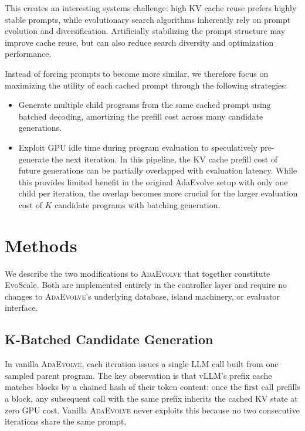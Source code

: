 \documentclass{article}
\newcommand{\adaev}{\textsc{AdaEvolve}}
\begin{document}
This creates an interesting systems challenge: high KV cache reuse prefers highly stable prompts, while evolutionary search algorithms inherently rely on prompt evolution and diversification. Artificially stabilizing the prompt structure may improve cache reuse, but can also reduce search diversity and optimization performance.

Instead of forcing prompts to become more similar, we therefore focus on maximizing the utility of each cached prompt through the following strategies:
\begin{itemize}
    \item Generate multiple child programs from the same cached prompt using batched decoding, amortizing the prefill cost across many candidate generations.
    
    \item Exploit GPU idle time during program evaluation to speculatively pre-generate the next iteration. In this pipeline, the KV cache prefill cost of future generations can be partially overlapped with evaluation latency. While this provides limited benefit in the original AdaEvolve setup with only one child per iteration, the overlap becomes more crucial for the larger evaluation cost of $K$ candidate programs with batching generation.
\end{itemize}


\section{Methods}

We describe the two modifications to \adaev{} that together constitute
EvoScale. Both are implemented entirely in the controller layer and
require no changes to \adaev{}'s underlying database, island machinery,
or evaluator interface.

\subsection{K-Batched Candidate Generation}

In vanilla \adaev{}, each iteration issues a single LLM call built from
one sampled parent program. The key observation is that vLLM's prefix
cache matches blocks by a chained hash of their token content: once the
first call prefills a block, any subsequent call with the same prefix
inherits the cached KV state at zero GPU cost. Vanilla \adaev{} never
exploits this because no two consecutive iterations share the same
prompt.
\end{document}

